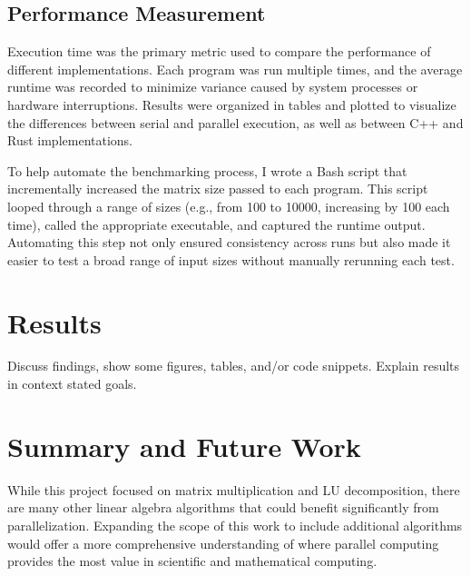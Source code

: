 \documentclass[12pt]{article}
\begin{document}
\subsection*{Performance Measurement}

Execution time was the primary metric used to compare the performance of different implementations. Each program was run multiple times, and the average
runtime was recorded to minimize variance caused by system processes or hardware interruptions. Results were organized in tables and plotted to visualize
the differences between serial and parallel execution, as well as between C++ and Rust implementations.

To help automate the benchmarking process, I wrote a Bash script that incrementally increased the matrix size passed to each program. This script looped
through a range of sizes (e.g., from 100 to 10000, increasing by 100 each time), called the appropriate executable, and captured the runtime output.
Automating this step not only ensured consistency across runs but also made it easier to test a broad range of input sizes without manually rerunning
each test.


\section{Results}
Discuss findings, show some figures, tables, and/or code snippets.
Explain results in context stated goals.


\section{Summary and Future Work}
While this project focused on matrix multiplication and LU decomposition, there are many other linear algebra algorithms that could benefit significantly
from parallelization. Expanding the scope of this work to include additional algorithms would offer a more comprehensive understanding of where parallel
computing provides the most value in scientific and mathematical computing.
\end{document}
